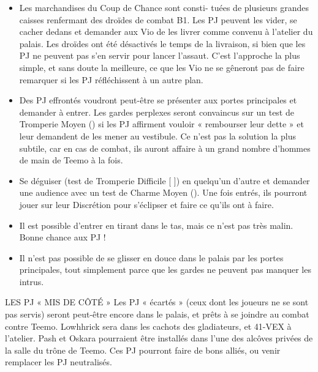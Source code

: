 \documentclass[a4paper,10pt,twoside,twocolumn,openany]{book}
\begin{document}
\begin{itemize}
    \item Les marchandises du Coup de Chance sont consti-
tuées de plusieurs grandes caisses renfermant des
droïdes de combat B1. Les PJ peuvent les vider, se
cacher dedans et demander aux Vio de les livrer
comme convenu à l’atelier du palais. Les droïdes
ont été désactivés le temps de la livraison, si bien
que les PJ ne peuvent pas s’en servir pour lancer
l’assaut. C’est l’approche la plus simple, et sans
doute la meilleure, ce que les Vio ne se gêneront
pas de faire remarquer si les PJ réfléchissent à un
autre plan.

    \item  Des PJ effrontés voudront peut-être se présenter
aux portes principales et demander à entrer. Les
gardes perplexes seront convaincus sur un test de
Tromperie Moyen (\difficulty \difficulty) si les PJ affirment vouloir
« rembourser leur dette » et leur demandent de les
mener au vestibule. Ce n’est pas la solution la plus
subtile, car en cas de combat, ils auront affaire à
un grand nombre d’hommes de main de Teemo à
la fois.

    \item  Se déguiser (test de Tromperie Difficile [ \difficulty \difficulty \difficulty ])
en quelqu’un d’autre et demander une audience avec
un test de Charme Moyen (\difficulty \difficulty). Une fois entrés,
ils pourront jouer sur leur Discrétion pour s’éclipser
et faire ce qu’ils ont à faire.

    \item  Il est possible d’entrer en tirant dans le tas, mais ce
n’est pas très malin. Bonne chance aux PJ !

    \item  Il n’est pas possible de se glisser en douce dans le palais par les portes principales, tout simplement parce
que les gardes ne peuvent pas manquer les intrus.

\end{itemize}

\begin{commentbox}{LES PJ « MIS DE CÔTÉ »}
  Les PJ « écartés » (ceux dont les joueurs ne se sont
pas servis) seront peut-être encore dans le palais,
et prêts à se joindre au combat contre Teemo.
Lowhhrick sera dans les cachots des gladiateurs, et
41-VEX à l’atelier. Pash et Oskara pourraient être
installés dans l’une des alcôves privées de la salle
du trône de Teemo. Ces PJ pourront faire de bons
alliés, ou venir remplacer les PJ neutralisés.
\end{commentbox}
\end{document}
